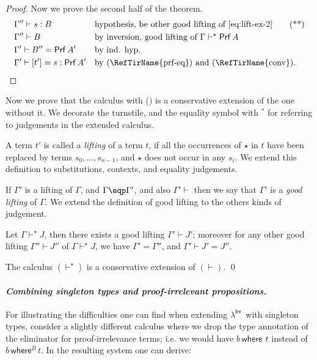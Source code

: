 \documentclass{LMCS}
\theoremstyle{plain}\newtheorem{satz}[thm]{Satz}
\newcommand{\LONGVERSION}[1]{#1}
\newcommand{\SHORTVERSION}[1]{}
\newcommand{\proofLine}[2]{&#1&&\text{#2}}
\newcommand{\lambdaPI}{\texorpdfstring{\ensuremath{\lambda^{\mathsf{Irr}}}}{Proof-irrelevance}}
\newcommand{\lambdaIrr}{\lambdaPI}
\newcommand{\boxty}[1]{[#1]}
\newcommand{\boxtm}[1]{[#1]}
\newcommand{\dtype}[2]{#1\vdash#2}
\newcommand{\dterm}[3]{#1\vdash#3:#2}
\newcommand{\deqtype}[3]{#1\vdash#2=#3}
\newcommand{\deqterm}[4]{#1\vdash#3=#4:#2}
\newcommand{\vdashp}{\vdash^{\oprf}}\newcommand{\sdctx}[1]{#1\vdashp}
\newcommand{\sdtype}[2]{#1\vdashp#2}
\newcommand{\ruleref}[1]{(\RefTirName{#1})}
\newcommand{\oprf}{\dprf}
\newcommand{\dprf}{\star}
\renewcommand{\boxty}[1]{\mathsf{Prf}\,#1}
\newcommand{\whereraw}{\mathsf{where}}
\newcommand{\wheretm}[3]{#1\,\whereraw\!^{#3}\,#2}
\newcommand{\enum}[1]{\mathsf{N}_{#1}}
\newcommand{\const}[2]{\mathsf{c}^{#1}_{#2}}
\newcommand{\LONGVERSION}[1]{}
\newcommand{\SHORTVERSION}[1]{#1}
\newcommand{\LONGSHORT}[2]{\LONGVERSION{#1}\SHORTVERSION{#2}}
\newcommand{\para}[1]{
\LONGSHORT{\paragraph{\it #1.}}
          {\vspace{1ex}\noindent{\it #1.}}
}
\begin{document}
{\begin{proof}
  Now we prove the second half of the theorem.
  \begin{align*}
    \proofLine{\dterm{\Gamma''}{B}{s}}{hypothesis, be other good lifting of \eqref{eq:lift-ex-2}}\tag{**}\label{eq-lift-ex-3}\\
    \proofLine{\dtype{\Gamma''}{B}}{by inversion, good lifting of $\sdtype{\Gamma}{\boxty{A}}$}\\
    \proofLine{\deqtype{\Gamma'}{B''}{\boxty{A'}}}{by ind. hyp.}\\
    \proofLine{\deqterm{\Gamma'}{\boxty{A'}}{\boxtm{t'}}{s}}{by \ruleref{prf-eq} and \ruleref{conv}}.
  \end{align*}
\end{proof}
}{
Now we prove that the calculus with \ruleref{prf-tm} is a
conservative extension of the one without it.  We decorate the
turnstile, and the equality symbol with $^\ast$ for referring to
judgements in the extended calculus.

\begin{defi}
  A term $t'$ is called a {\em lifting} of a term $t$, if all the
  occurrences of $\oprf$ in $t$ have been replaced by terms
  $s_0,\ldots,s_{n-1}$, and $\oprf$ does not occur in any $s_i$. We
  extend this definition to substitutions, contexts, and equality
  judgements.

  If $\Gamma'$ is a lifting of $\Gamma$, and $\Gamma \eqp \Gamma'$,
  and also $\Gamma'\vdash$ then we say that $\Gamma'$ is a {\em
    good lifting} of $\Gamma$.  We extend the definition of
  good lifting to the others kinds of judgement.
\end{defi}


\begin{lem}
  Let $\Gamma \vdashp J$, then there exists a good lifting $\Gamma'
  \vdash J'$; moreover for any other good lifting $\Gamma''\vdash J''$
  of $\Gamma\vdashp J$, we have $\Gamma' = \Gamma''$, and 
  $\Gamma'\vdash J' = J''$.
\end{lem}
}


\begin{cor}
  \label{cor:cons-prf-tm}
  The calculus $(\vdashp)$ is a conservative extension of $(\vdash)$. \qed
\end{cor}

\para{Combining singleton types and proof-irrelevant propositions}
For illustrating the difficulties one can find when extending
\lambdaIrr\ with singleton types, consider a slightly different
calculus where we drop the type annotation of the eliminator for
proof-irrelevance terms; i.e. we would have $\wheretm{b}{t}{\ }$
instead of $\wheretm{b}{t}{B}$. In the resulting system one can
derive: \newcommand{\czero}{\const{2}{0}}
\newcommand{\cone}{\const{2}{1}} \newcommand{\TyN}{\enum{2}}
\newcommand{\TyZero}{\singTm{\czero}{\TyN}}
\newcommand{\TyOne}{\singTm{\cone}{\TyN}}
\end{document}
